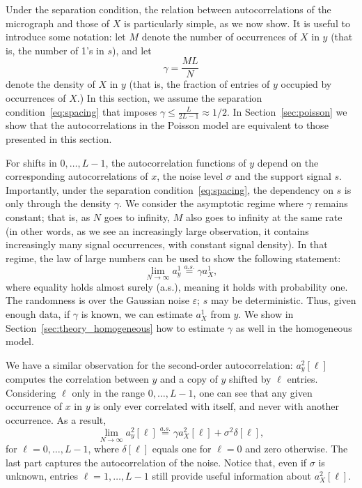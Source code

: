 \documentclass[12pt]{article}
\newcommand{\E}{\mathbb{E}}
\newcommand{\1}{\mathbf{1}}
\newcommand{\TODO}[1]{{\color{red}{[#1]}}}
\newcommand{\aseq}{\stackrel{a.s.}{=}}
\theoremstyle{plain}
\theoremstyle{definition}
\theoremstyle{remark}
\theoremstyle{plain}
\theoremstyle{remark}
\theoremstyle{plain}
\theoremstyle{plain}
\theoremstyle{plain}
\numberwithin{equation}{section}
\begin{document}
Under the separation condition, the relation between autocorrelations of the micrograph and those of $X$ is particularly simple, as we now show. It is useful to introduce some notation: let $M$ denote the number of occurrences of $X$ in $y$ (that is, the number of 1's in $s$), and let
\begin{equation}
\gamma  = \frac{M L}{N}
\label{eq:gamma}
\end{equation}
denote the density of $X$ in $y$ (that is, the fraction of entries of $y$ occupied by occurrences of $X$.) 
In this section, we assume the separation condition~\eqref{eq:spacing} that  imposes $\gamma\leq\frac{L}{2L-1}\approx 1/2$. In Section~\ref{sec:poisson} we show that the autocorrelations in the Poisson model are equivalent to  those presented in this section.

For shifts in $0, \ldots, L-1$, the autocorrelation functions of $y$ depend on the corresponding autocorrelations of $x$, the noise level $\sigma$ and the support signal $s$. Importantly, under the separation condition~\eqref{eq:spacing}, the dependency on $s$ is only through the density $\gamma$.
We consider the asymptotic regime where $\gamma$ remains constant; that is, as $N$ goes to infinity, $M$ also goes to infinity at the same rate (in other words, as we see an increasingly large observation, it contains increasingly many signal occurrences, with constant signal density). In that regime, the law of large numbers can be used to show the following statement:
\begin{equation} \label{eq:mean_micrograph}
\lim_{N\to\infty} a_y^1  \aseq \gamma a_{X}^1,
\end{equation}
\TODO{ should is be $\E\left\{a_{X}^1\right\}$?} where equality holds almost surely (a.s.), meaning it holds with probability one.
The randomness is over the Gaussian noise $\varepsilon$; $s$ may be deterministic.
Thus, given enough data, if $\gamma$ is known, we can estimate $a_{X}^1$ from $y$. We show in Section~\ref{sec:theory_homogeneous} how to estimate $\gamma$ as well in the homogeneous model. 

We have a similar observation for the second-order autocorrelation: $a_y^2[\ell]$ computes the correlation between $y$ and a copy of $y$ shifted by $\ell$ entries. Considering $\ell$ only in the range $0, \ldots, L-1$, one can see that any given occurrence of $x$ in $y$ is only ever correlated with itself, and never with another occurrence. As a result,
\begin{equation}
\lim_{N\to\infty} a_y^2[\ell]  \aseq \gamma a_{X}^2[\ell] + \sigma^2\delta[\ell],
\label{eq:ac2_micrograph}
\end{equation}
for $\ell = 0, \ldots, L-1$, where $\delta[\ell]$ equals one for $\ell=0$ and zero otherwise. The last part captures the autocorrelation of the noise. Notice that, even if $\sigma$ is unknown, entries $\ell = 1, \ldots, L-1$ still provide useful information about $a_{X}^2[\ell]$.
\end{document}
